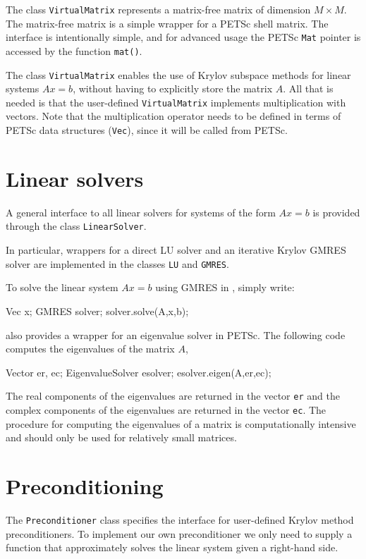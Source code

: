 The \dolfin{} class \texttt{VirtualMatrix} represents a matrix-free 
matrix of dimension $M\times M$. 
The matrix-free matrix is a simple wrapper for a PETSc shell matrix. 
The interface is intentionally simple, and for advanced usage the 
PETSc \texttt{Mat} pointer is accessed by the function \texttt{mat()}.  

The class \texttt{VirtualMatrix} enables the use of Krylov subspace
methods for linear systems $Ax = b$, without having to explicitly
store the matrix $A$. All that is needed is that the user-defined
\texttt{VirtualMatrix} implements multiplication with vectors. 
Note that the multiplication operator needs to be defined in terms of
PETSc data structures (\texttt{Vec}), since it will be called from PETSc.

\section{Linear solvers}

A general interface to all linear solvers for systems of the form 
$Ax=b$ is provided through the class \texttt{LinearSolver}. 

In particular, wrappers for a direct LU solver and an iterative 
Krylov GMRES solver are implemented in the classes \texttt{LU} and \texttt{GMRES}. 

To solve the linear system $Ax=b$ using GMRES in \dolfin{}, simply write:  
%
\begin{code} 
Vec x;
GMRES solver; 
solver.solve(A,x,b);
\end{code} 
%
\dolfin{} also provides a wrapper for an eigenvalue 
solver in PETSc. The following code computes the 
eigenvalues of the matrix $A$,
\begin{code} 
Vector er, ec;
EigenvalueSolver esolver; 
esolver.eigen(A,er,ec);
\end{code} 
The real components of the eigenvalues are returned in the vector \texttt{er} and
the complex components of the eigenvalues are returned in the vector \texttt{ec}.
The procedure for computing the eigenvalues of a matrix is computationally 
intensive and should only be used for relatively small matrices.


\section{Preconditioning}

The \texttt{Preconditioner} class specifies the interface for user-defined 
Krylov method preconditioners. To implement our own preconditioner we only 
need to supply a function that approximately solves the linear system given 
a right-hand side.


